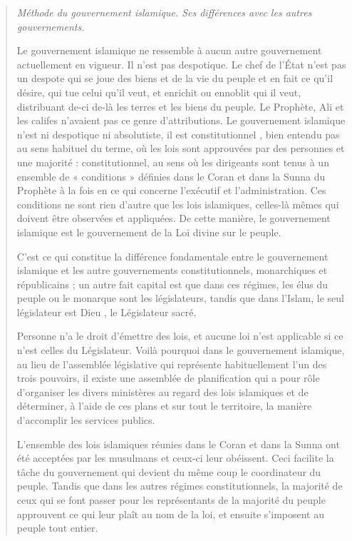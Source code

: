\begin{quote}
    

\emph{Méthode du gouvernement islamique. Ses différences avec les autres
gouvernements.} 

Le gouvernement islamique ne ressemble à aucun autre gouvernement
actuellement en vigueur. Il n'est pas despotique. Le chef de l'État
n'est pas un despote qui se joue des biens et de la vie du peuple et en
fait ce qu'il désire, qui tue celui qu'il veut, et enrichit ou ennoblit
qui il veut, distribuant de-ci de-là les terres et les biens du peuple.
Le Prophète, Ali et les califes n'avaient pas ce genre d'attributions.
Le gouvernement islamique n'est ni despotique ni absolutiste, il est
constitutionnel , bien entendu pas au sens habituel du terme, où les lois
sont approuvées par des personnes et une majorité : constitutionnel, au
sens où les dirigeants sont tenus à un ensemble de « conditions »
définies dans le Coran et dans la Sunna du Prophète à la fois en ce qui
concerne l'exécutif et l'administration. Ces conditions ne sont rien
d'autre que les lois islamiques, celles-là mêmes qui doivent être
observées et appliquées. De cette manière, le gouvernement islamique est
le gouvernement de la Loi divine sur le peuple.

C'est ce qui constitue la différence fondamentale entre le gouvernement
islamique et les autre gouvernements constitutionnels, monarchiques et
républicains ; un autre fait capital est que dans ces régimes, les élus
du peuple ou le monarque sont les législateurs, tandis que dans l'Islam,
le seul législateur est Dieu , le Législateur sacré.

Personne n'a le droit d'émettre des lois, et aucune loi n'est applicable
si ce n'est celles du Législateur. Voilà pourquoi dans le gouvernement
islamique, au lieu de l'assemblée législative qui représente
habituellement l'un des trois pouvoirs, il existe une assemblée de
planification qui a pour rôle d'organiser les divers ministères au
regard des lois islamiques et de déterminer, à l'aide de ces plans et
sur tout le territoire, la manière d'accomplir les services publics.

L'ensemble des lois islamiques réunies dans le Coran et dans la Sunna
ont été acceptées par les musulmans et ceux-ci leur obéissent. Ceci
facilite la tâche du gouvernement qui devient du même coup le
coordinateur du peuple. Tandis que dans les autres régimes
constitutionnels, la majorité de ceux qui se font passer pour les
représentants de la majorité du peuple approuvent ce qui leur plaît au
nom de la loi, et ensuite s'imposent au peuple tout entier.


\end{quote}
